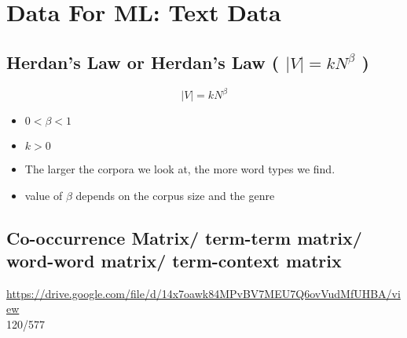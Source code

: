 \chapter{Data For ML: Text Data}

\section{Herdan’s Law or Herdan’s Law ( $|V| = kN^{\beta}$ ) \cite{nlp-1}}

\begin{equation}
    |V| = kN^{\beta}
\end{equation}

\begin{itemize}
    \item $0 < \beta < 1$ 
    \item $k > 0$
    \item The larger the corpora we look at, the more word types we find.
    \item value of $\beta$ depends on the corpus size and the genre
\end{itemize}


\section{Co-occurrence Matrix/ term-term matrix/ word-word matrix/ term-context matrix \cite{nlp-1}}\label{Co-occurrence Matrix/ term-term matrix/ word-word matrix/ term-context matrix}

\url{https://drive.google.com/file/d/14x7oawk84MPvBV7MEU7Q6ovVudMfUHBA/view}\\
120/577








































